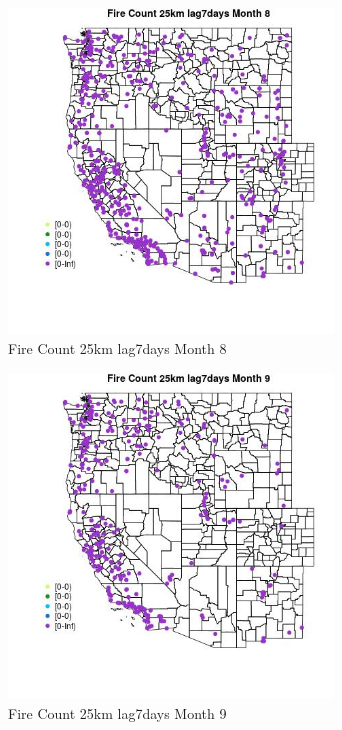 \begin{figure} 
\centering  
\includegraphics[width=0.77\textwidth]{Code_Outputs/Report_ML_input_PM25_Step4_part_e_de_duplicated_aves_compiled_2019-05-18wNAs_MapObsMo8Fire_Count_25km_lag7days.jpg} 
\caption{\label{fig:Report_ML_input_PM25_Step4_part_e_de_duplicated_aves_compiled_2019-05-18wNAsMapObsMo8Fire_Count_25km_lag7days}Fire Count 25km lag7days Month 8} 
\end{figure} 
 

\clearpage 

\begin{figure} 
\centering  
\includegraphics[width=0.77\textwidth]{Code_Outputs/Report_ML_input_PM25_Step4_part_e_de_duplicated_aves_compiled_2019-05-18wNAs_MapObsMo9Fire_Count_25km_lag7days.jpg} 
\caption{\label{fig:Report_ML_input_PM25_Step4_part_e_de_duplicated_aves_compiled_2019-05-18wNAsMapObsMo9Fire_Count_25km_lag7days}Fire Count 25km lag7days Month 9} 
\end{figure} 
 

